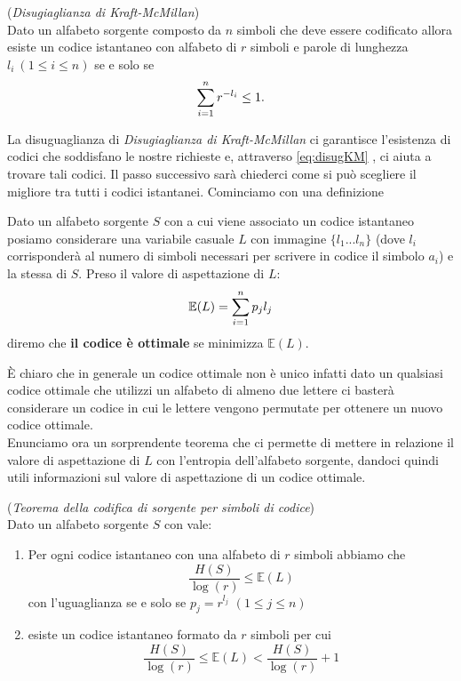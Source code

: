 \begin{teo} \label{teo:disugKM} (\textit{Disugiaglianza di Kraft-McMillan})\\
Dato un alfabeto sorgente composto da $n$ simboli che deve essere codificato allora esiste un codice istantaneo con alfabeto di $r$ simboli e parole di lunghezza $l_i \ (1 \leq i \leq n)$ se e solo se 
\begin{equation} \label{eq:disugKM}
\sum_{i=1}^n r^{-l_i}\leq 1.
\end{equation} 
\end{teo}

La disuguaglianza di \textit{Disugiaglianza di Kraft-McMillan} ci garantisce l'esistenza di codici che soddisfano le nostre richieste e, attraverso \ref{eq:disugKM} , ci aiuta a trovare tali codici. Il passo successivo sarà chiederci come si può scegliere il migliore tra tutti i codici istantanei. Cominciamo con una definizione

\begin{defi}
Dato un alfabeto sorgente $S$ \va  con \lep  a cui viene associato un codice istantaneo posiamo considerare una variabile casuale $L$ con immagine $\{ l_1...l_n \}$ (dove $l_i$ corrisponderà al numero di simboli necessari per scrivere in codice il simbolo $a_i$) e \lep  la stessa di $S$. Preso il valore di aspettazione di $L$:
$$\mathbb{E}(L)=\sum_{i=1}^n p_j l_j$$ 
diremo che \textbf{il codice è ottimale} se minimizza $\mathbb{E}(L)$.
\end{defi}
È chiaro che in generale un codice ottimale non è unico infatti dato un qualsiasi codice ottimale che utilizzi un alfabeto di almeno due lettere ci basterà considerare un codice in cui le lettere vengono permutate per ottenere un nuovo codice ottimale.\\
Enunciamo ora un sorprendente teorema che ci permette di mettere in relazione il valore di aspettazione di $L$ con l'entropia dell'alfabeto sorgente, dandoci quindi utili informazioni sul valore di aspettazione di un codice ottimale.
 
\begin{teo}(\textit{Teorema della codifica di sorgente per simboli di codice})\\
Dato un alfabeto sorgente $S$ con \lep vale:
\begin{enumerate}
\item Per ogni codice istantaneo con una alfabeto di $r$ simboli abbiamo che
\begin{equation}
\frac{H(S)}{\log (r)} \leq \mathbb{E}(L)
\end{equation}
con l'uguaglianza se e solo se $p_j=r^{l_j}$ $(1 \leq j \leq n)$
\item esiste un codice istantaneo formato da $r$ simboli per cui
\begin{equation}
\frac{H(S)}{\log (r)} \leq \mathbb{E}(L) < \frac{H(S)}{\log (r)} +1
\end{equation}
\end{enumerate}
\end{teo}

